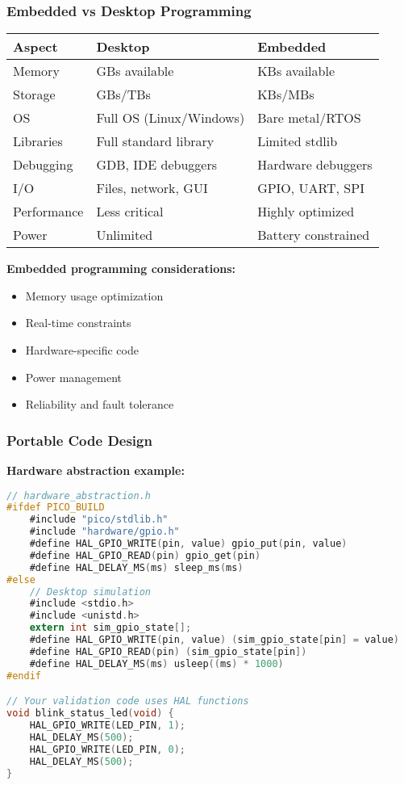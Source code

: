 \documentclass{beamer}
\begin{document}
\begin{frame}
\frametitle{Embedded vs Desktop Programming}
\begin{center}
\begin{tabular}{|l|l|l|}
\hline
\textbf{Aspect} & \textbf{Desktop} & \textbf{Embedded} \\
\hline
Memory & GBs available & KBs available \\
Storage & GBs/TBs & KBs/MBs \\
OS & Full OS (Linux/Windows) & Bare metal/RTOS \\
Libraries & Full standard library & Limited stdlib \\
Debugging & GDB, IDE debuggers & Hardware debuggers \\
I/O & Files, network, GUI & GPIO, UART, SPI \\
Performance & Less critical & Highly optimized \\
Power & Unlimited & Battery constrained \\
\hline
\end{tabular}
\end{center}

\vspace{0.5cm}
\textbf{Embedded programming considerations:}
\begin{itemize}
    \item Memory usage optimization
    \item Real-time constraints
    \item Hardware-specific code
    \item Power management
    \item Reliability and fault tolerance
\end{itemize}
\end{frame}

\begin{frame}[fragile]
\frametitle{Portable Code Design}
\textbf{Hardware abstraction example:}
\begin{lstlisting}[language=C]
// hardware_abstraction.h
#ifdef PICO_BUILD
    #include "pico/stdlib.h"
    #include "hardware/gpio.h"
    #define HAL_GPIO_WRITE(pin, value) gpio_put(pin, value)
    #define HAL_GPIO_READ(pin) gpio_get(pin)
    #define HAL_DELAY_MS(ms) sleep_ms(ms)
#else
    // Desktop simulation
    #include <stdio.h>
    #include <unistd.h>
    extern int sim_gpio_state[];
    #define HAL_GPIO_WRITE(pin, value) (sim_gpio_state[pin] = value)
    #define HAL_GPIO_READ(pin) (sim_gpio_state[pin])
    #define HAL_DELAY_MS(ms) usleep((ms) * 1000)
#endif

// Your validation code uses HAL functions
void blink_status_led(void) {
    HAL_GPIO_WRITE(LED_PIN, 1);
    HAL_DELAY_MS(500);
    HAL_GPIO_WRITE(LED_PIN, 0);
    HAL_DELAY_MS(500);
}
\end{lstlisting}
\end{frame}
\end{document}
